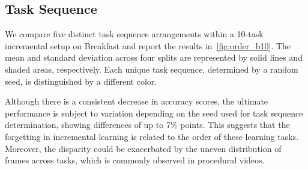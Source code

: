 \subsection{Task Sequence}
\label{abs:task_seq}



We compare five distinct task sequence arrangements within a 10-task incremental setup on Breakfast and report the results in~\cref{fig:order_b10}. The mean and standard deviation across four splits are represented by solid lines and shaded areas, respectively. Each unique task sequence, determined by a random seed, is distinguished by a different color.

Although there is a consistent decrease in accuracy scores, the ultimate performance is subject to variation depending on the seed used for task sequence determination, showing differences of up to 7\% points. This suggests that the forgetting in incremental learning is related to the order of these learning tasks. Moreover, the disparity could be exacerbated by the uneven distribution of frames across tasks, which is commonly observed in procedural videos. 



